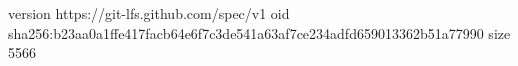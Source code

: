 version https://git-lfs.github.com/spec/v1
oid sha256:b23aa0a1ffe417facb64e6f7c3de541a63af7ce234adfd659013362b51a77990
size 5566
